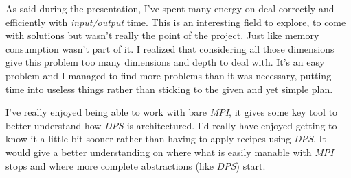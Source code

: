 \documentclass[10pt,a4paper]{article}
\begin{document}
As said during the presentation, I've spent many energy on deal correctly and
efficiently with \emph{input/output} time. This is an interesting field to
explore, to come with solutions but wasn't really the point of the project.
Just like memory consumption wasn't part of it. I realized that considering
all those dimensions give this problem too many dimensions and depth to deal
with. It's an easy problem and I managed to find more problems than it was
necessary, putting time into useless things rather than sticking to the given
and yet simple plan.

I've really enjoyed being able to work with bare \emph{MPI}, it gives some key
tool to better understand how \emph{DPS} is architectured. I'd really have
enjoyed getting to know it a little bit sooner rather than having to apply
recipes using \emph{DPS}. It would give a better understanding on where what
is easily manable with \emph{MPI} stops and where more complete abstractions
(like \emph{DPS}) start.
\end{document}

